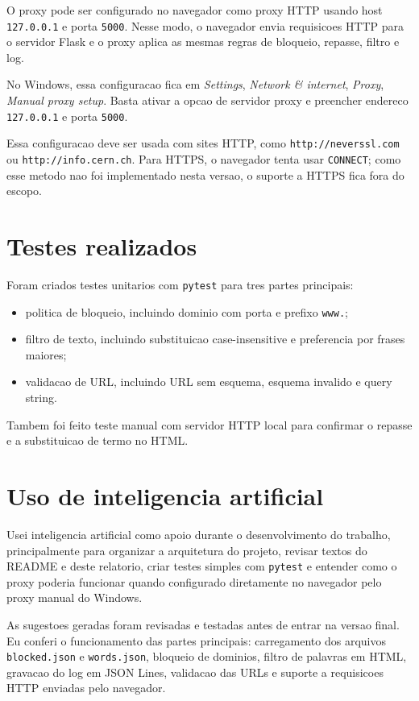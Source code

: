 \documentclass[12pt,a4paper]{article}
\begin{document}
O proxy pode ser configurado no navegador como proxy HTTP usando host \texttt{127.0.0.1} e porta \texttt{5000}. Nesse modo, o navegador envia requisicoes HTTP para o servidor Flask e o proxy aplica as mesmas regras de bloqueio, repasse, filtro e log.

No Windows, essa configuracao fica em \textit{Settings}, \textit{Network \& internet}, \textit{Proxy}, \textit{Manual proxy setup}. Basta ativar a opcao de servidor proxy e preencher endereco \texttt{127.0.0.1} e porta \texttt{5000}.

Essa configuracao deve ser usada com sites HTTP, como \texttt{http://neverssl.com} ou \texttt{http://info.cern.ch}. Para HTTPS, o navegador tenta usar \texttt{CONNECT}; como esse metodo nao foi implementado nesta versao, o suporte a HTTPS fica fora do escopo.

\section{Testes realizados}

Foram criados testes unitarios com \texttt{pytest} para tres partes principais:

\begin{itemize}
  \item politica de bloqueio, incluindo dominio com porta e prefixo \texttt{www.};
  \item filtro de texto, incluindo substituicao case-insensitive e preferencia por frases maiores;
  \item validacao de URL, incluindo URL sem esquema, esquema invalido e query string.
\end{itemize}

Tambem foi feito teste manual com servidor HTTP local para confirmar o repasse e a substituicao de termo no HTML.

\section{Uso de inteligencia artificial}

Usei inteligencia artificial como apoio durante o desenvolvimento do trabalho, principalmente para organizar a arquitetura do projeto, revisar textos do README e deste relatorio, criar testes simples com \texttt{pytest} e entender como o proxy poderia funcionar quando configurado diretamente no navegador pelo proxy manual do Windows.

As sugestoes geradas foram revisadas e testadas antes de entrar na versao final. Eu conferi o funcionamento das partes principais: carregamento dos arquivos \texttt{blocked.json} e \texttt{words.json}, bloqueio de dominios, filtro de palavras em HTML, gravacao do log em JSON Lines, validacao das URLs e suporte a requisicoes HTTP enviadas pelo navegador.
\end{document}
